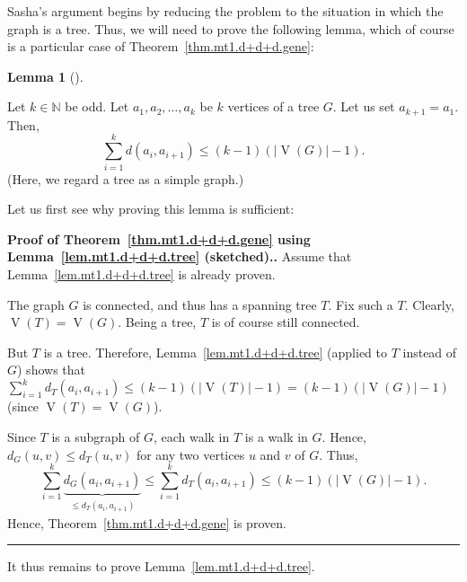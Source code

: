 \documentclass[numbers=enddot,12pt,final,onecolumn,notitlepage]{scrartcl}%
\theoremstyle{definition}
\newtheorem{lem}[theo]{Lemma}
\newenvironment{lemma}[1][]
{\begin{lem}[#1]\begin{leftbar}}
{\end{leftbar}\end{lem}}
\newenvironment{proof}[1][Proof]{\noindent\textbf{#1.} }{\ \rule{0.5em}{0.5em}}
\let\sumnonlimits\sum
\renewcommand{\sum}{\sumnonlimits\limits}
\newcommand{\NN}{\mathbb{N}}
\newcommand{\abs}[1]{\left| #1 \right|}
\newcommand{\tup}[1]{\left( #1 \right)}
\newcommand{\verts}[1]{\operatorname{V}\left( #1 \right)}
\newcommand{\underbrack}[2]{\underbrace{#1}_{\substack{#2}}}
\begin{document}
Sasha's argument begins by reducing the problem to the situation in
which the graph is a tree. Thus, we will need to prove the following
lemma, which of course is a particular case of
Theorem~\ref{thm.mt1.d+d+d.gene}:

\begin{lemma} \label{lem.mt1.d+d+d.tree}
Let $k \in \NN$ be odd. Let $a_1, a_2, \ldots, a_k$ be $k$ vertices of
a tree $G$. Let us set $a_{k+1} = a_1$. Then,
\[
\sum_{i=1}^k d \tup{a_i, a_{i+1}}
\leq \tup{k-1} \tup{\abs{\verts{G}}-1} .
\]
(Here, we regard a tree as a simple graph.)
\end{lemma}

Let us first see why proving this lemma is sufficient:

\begin{proof}[Proof of Theorem~\ref{thm.mt1.d+d+d.gene} using
Lemma~\ref{lem.mt1.d+d+d.tree} (sketched).]
Assume that Lemma~\ref{lem.mt1.d+d+d.tree} is already proven.

The graph $G$ is connected, and thus has a spanning tree $T$. Fix such
a $T$. Clearly, $\verts{T} = \verts{G}$.
Being a tree, $T$ is of course still connected.

But $T$ is a tree. Therefore, Lemma~\ref{lem.mt1.d+d+d.tree} (applied
to $T$ instead of $G$) shows that
$\sum_{i=1}^k d_T \tup{a_i, a_{i+1}} \leq \tup{k-1}
\tup{\abs{\verts{T}}-1} = \tup{k-1} \tup{\abs{\verts{G}} - 1}$
(since $\verts{T} = \verts{G}$).

Since $T$ is a subgraph of $G$, each walk in $T$ is a walk in
$G$. Hence, $d_G \tup{u, v} \leq d_T \tup{u, v}$ for any two vertices
$u$ and $v$ of $G$. Thus,
\[
\sum_{i=1}^k \underbrack{d_G \tup{a_i, a_{i+1}}}
                        {\leq d_T \tup{a_i, a_{i+1}}}
\leq
\sum_{i=1}^k d_T \tup{a_i, a_{i+1}} \leq \tup{k-1}
\tup{\abs{\verts{G}}-1} .
\]
Hence, Theorem~\ref{thm.mt1.d+d+d.gene} is proven.
\end{proof}

It thus remains to prove Lemma~\ref{lem.mt1.d+d+d.tree}.
\end{document}
